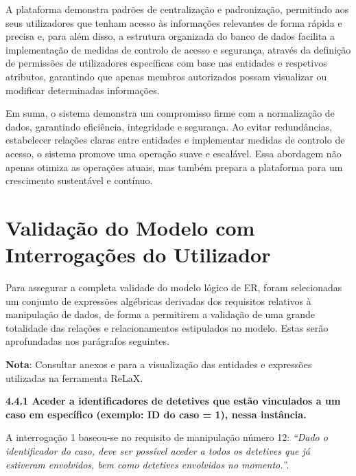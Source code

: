 \documentclass[a4paper,12pt]{scrreprt}
\begin{document}
        A plataforma demonstra padrões de centralização e padronização, permitindo aos seus utilizadores que tenham acesso às informações relevantes de forma rápida e precisa e, para além disso, a estrutura organizada do banco de dados facilita a implementação de medidas de controlo de acesso e segurança, através da definição de permissões de utilizadores específicas com base nas entidades e respetivos atributos, garantindo que apenas membros autorizados possam visualizar ou modificar determinadas informações.

        Em suma, o sistema demonstra um compromisso firme com a normalização de dados, garantindo eficiência, integridade e segurança. Ao evitar redundâncias, estabelecer relações claras entre entidades e implementar medidas de controlo de acesso, o sistema promove uma operação suave e escalável. Essa abordagem não apenas otimiza as operações atuais, mas também prepara a plataforma para um crescimento sustentável e contínuo.


    \clearpage
    \section{Validação do Modelo com Interrogações do Utilizador}
        Para assegurar a completa validade do modelo lógico de ER, foram selecionadas um conjunto de expressões algébricas derivadas dos requisitos relativos à manipulação de dados, de forma a permitirem a validação de uma grande totalidade das relações e relacionamentos estipulados no modelo. Estas serão aprofundadas nos parágrafos seguintes.

        \textbf{Nota}: Consultar anexos \textit{} e \textit{} para a visualização das entidades e expressões utilizadas na ferramenta ReLaX.

\clearpage

{\large\textbf{4.4.1 Aceder a identificadores de detetives que estão vinculados a um caso em específico (exemplo: ID do caso = 1), nessa instância.}}

\vspace{0.2cm}

A interrogação 1 baseou-se no requisito de manipulação número 12: \textit{“Dado o identificador do caso, deve ser possível aceder a todos os detetives que já estiveram envolvidos, bem como detetives envolvidos no momento.”}.

\vspace{0.2cm}
\end{document}
